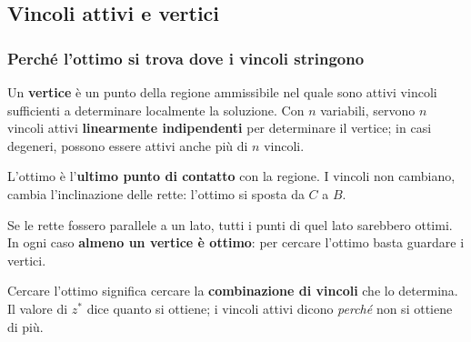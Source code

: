 

\subsection{Vincoli attivi e vertici}%

\begin{frame}%
%

\frametitle{Perch\'{e} l'ottimo si trova dove i vincoli stringono}%
%

%




Un \textbf{vertice} \`{e} un punto della regione ammissibile nel quale sono
attivi vincoli sufficienti a determinare localmente la soluzione. Con $n$
variabili, servono $n$ vincoli attivi \textbf{linearmente indipendenti} per
determinare il vertice; in casi degeneri, possono essere attivi anche pi\`{u}
di $n$ vincoli.

\begin{stepitemize}
\item L'ottimo \`{e} l'\textbf{ultimo punto di contatto} con la regione. I
vincoli non cambiano, cambia l'inclinazione delle rette: l'ottimo si sposta da
$C$ a $B$.

\item Se le rette fossero parallele a un lato, tutti i punti di quel lato
sarebbero ottimi. In ogni caso \textbf{almeno un vertice \`{e} ottimo}: per
cercare l'ottimo basta guardare i vertici.
\end{stepitemize}

\medskip

\begin{center}
{\small Cercare l'ottimo significa cercare la \textbf{combinazione di vincoli}
che lo determina. Il valore di $z^{*}$ dice quanto si ottiene; i vincoli
attivi dicono \emph{perch\'{e}} non si ottiene di pi\`{u}.}
\end{center}

%

\transboxout
\end{frame}%


